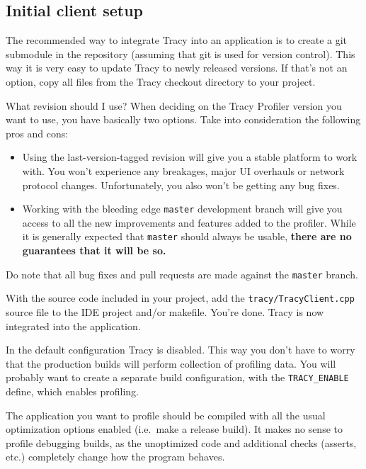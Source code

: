 \documentclass[hidelinks,titlepage,a4paper]{article}
\begin{document}
\subsection{Initial client setup}

The recommended way to integrate Tracy into an application is to create a git submodule in the repository (assuming that git is used for version control). This way it is very easy to update Tracy to newly released versions. If that's not an option, copy all files from the Tracy checkout directory to your project.

\begin{bclogo}[
noborder=true,
couleur=black!5,
logo=\bclampe
]{What revision should I use?}
When deciding on the Tracy Profiler version you want to use, you have basically two options. Take into consideration the following pros and cons:

\begin{itemize}
\item Using the last-version-tagged revision will give you a stable platform to work with. You won't experience any breakages, major UI overhauls or network protocol changes. Unfortunately, you also won't be getting any bug fixes.
\item Working with the bleeding edge \texttt{master} development branch will give you access to all the new improvements and features added to the profiler. While it is generally expected that \texttt{master} should always be usable, \textbf{there are no guarantees that it will be so.}
\end{itemize}

Do note that all bug fixes and pull requests are made against the \texttt{master} branch.
\end{bclogo}

With the source code included in your project, add the \texttt{tracy/TracyClient.cpp} source file to the IDE project and/or makefile. You're done. Tracy is now integrated into the application.

In the default configuration Tracy is disabled. This way you don't have to worry that the production builds will perform collection of profiling data. You will probably want to create a separate build configuration, with the \texttt{TRACY\_ENABLE} define, which enables profiling.

The application you want to profile should be compiled with all the usual optimization options enabled (i.e.~make a release build). It makes no sense to profile debugging builds, as the unoptimized code and additional checks (asserts, etc.) completely change how the program behaves.
\end{document}
